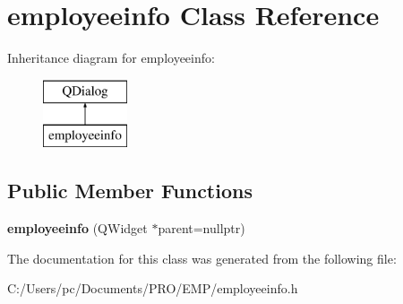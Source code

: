 \hypertarget{classemployeeinfo}{}\section{employeeinfo Class Reference}
\label{classemployeeinfo}
Inheritance diagram for employeeinfo\+:\begin{figure}[H]
\begin{center}
\leavevmode
\includegraphics[height=2.000000cm]{classemployeeinfo}
\end{center}
\end{figure}
\subsection*{Public Member Functions}
\begin{DoxyCompactItemize}
\item 
\mbox{\label{classemployeeinfo_a309c67c5a4eebc1008c877df78551f9a}} 
{\bfseries employeeinfo} (Q\+Widget $\ast$parent=nullptr)
\end{DoxyCompactItemize}


The documentation for this class was generated from the following file\+:\begin{DoxyCompactItemize}
\item 
C\+:/\+Users/pc/\+Documents/\+P\+R\+O/\+E\+M\+P/employeeinfo.\+h\end{DoxyCompactItemize}
